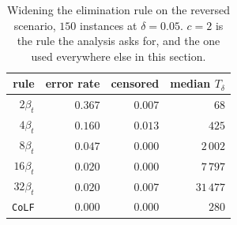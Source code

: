 \begin{table}[t]
  \centering
  \caption{Widening the elimination rule on the reversed scenario, $150$
  instances at $\delta=0.05$.  $c=2$ is the rule the analysis asks for, and the
  one used everywhere else in this section.}
  \label{tab:inflate}
  \small
  \begin{tabular}{rrrr}
    \toprule
    rule & error rate & censored & median $T_\delta$\\
    \midrule
    $2\beta_t$  & $0.367$ & $0.007$ & $68$\\
    $4\beta_t$  & $0.160$ & $0.013$ & $425$\\
    $8\beta_t$  & $0.047$ & $0.000$ & $2\,002$\\
    $16\beta_t$ & $0.020$ & $0.000$ & $7\,797$\\
    $32\beta_t$ & $0.020$ & $0.007$ & $31\,477$\\
    \midrule
    \texttt{CoLF} & $0.000$ & $0.000$ & $280$\\
    \bottomrule
  \end{tabular}
\end{table}
